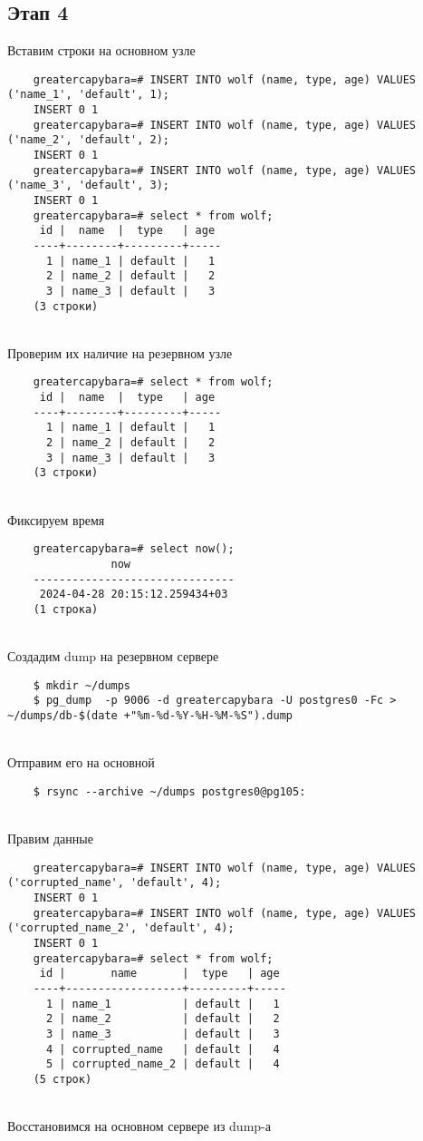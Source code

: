 \documentclass{article}
\begin{document}
\subsection{Этап 4}

Вставим строки на основном узле

\begin{verbatim}
    greatercapybara=# INSERT INTO wolf (name, type, age) VALUES ('name_1', 'default', 1);
    INSERT 0 1
    greatercapybara=# INSERT INTO wolf (name, type, age) VALUES ('name_2', 'default', 2);
    INSERT 0 1
    greatercapybara=# INSERT INTO wolf (name, type, age) VALUES ('name_3', 'default', 3);
    INSERT 0 1
    greatercapybara=# select * from wolf;
     id |  name  |  type   | age
    ----+--------+---------+-----
      1 | name_1 | default |   1
      2 | name_2 | default |   2
      3 | name_3 | default |   3
    (3 строки)
\end{verbatim} \\
Проверим их наличие на резервном узле

\begin{verbatim}
    greatercapybara=# select * from wolf;
     id |  name  |  type   | age
    ----+--------+---------+-----
      1 | name_1 | default |   1
      2 | name_2 | default |   2
      3 | name_3 | default |   3
    (3 строки)
\end{verbatim} \\
Фиксируем время

\begin{verbatim}
    greatercapybara=# select now();
                now
    -------------------------------
     2024-04-28 20:15:12.259434+03
    (1 строка)
\end{verbatim} \\
Создадим dump на резервном сервере

\begin{verbatim}
    $ mkdir ~/dumps
    $ pg_dump  -p 9006 -d greatercapybara -U postgres0 -Fc > ~/dumps/db-$(date +"%m-%d-%Y-%H-%M-%S").dump
\end{verbatim} \\
Отправим его на основной

\begin{verbatim}
    $ rsync --archive ~/dumps postgres0@pg105:
\end{verbatim} \\
Правим данные

\begin{verbatim}
    greatercapybara=# INSERT INTO wolf (name, type, age) VALUES ('corrupted_name', 'default', 4);
    INSERT 0 1
    greatercapybara=# INSERT INTO wolf (name, type, age) VALUES ('corrupted_name_2', 'default', 4);
    INSERT 0 1
    greatercapybara=# select * from wolf;
     id |       name       |  type   | age
    ----+------------------+---------+-----
      1 | name_1           | default |   1
      2 | name_2           | default |   2
      3 | name_3           | default |   3
      4 | corrupted_name   | default |   4
      5 | corrupted_name_2 | default |   4
    (5 строк)
\end{verbatim} \\
Восстановимся на основном сервере из dump-а
\end{document}
